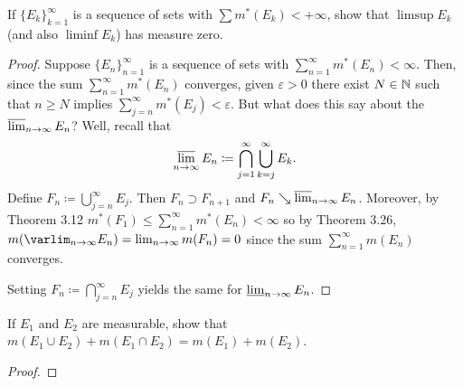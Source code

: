 \begin{problem}
  If ${\{E_k\}}_{k=1}^\infty$ is a sequence of sets with
  $\sum m^*(E_k)<+\infty$, show that $\limsup E_k$ (and also $\liminf E_k$)
  has measure zero.
\end{problem}
\begin{proof}
  Suppose ${\{E_n\}}_{n=1}^\infty$ is a sequence of sets with
  $\sum_{n=1}^\infty m^*(E_n)<\infty$. Then, since the sum
  $\sum_{n=1}^\infty m^*(E_n)$ converges, given $\varepsilon>0$ there
  exist $N\in\mathbb{N}$ such that $n\geq N$ implies
  $\sum_{j=n}^\infty m^*(E_j)<\varepsilon$. But what does this say about
  the $\varlimsup_{n\to\infty} E_n$? Well, recall that
  \[
    \varlimsup_{n\to\infty}
    E_n\coloneq\bigcap_{j=1}^\infty\bigcup_{k=j}^\infty E_k.
  \]
  Define $F_n\coloneq\bigcup_{j=n}^\infty E_j$. Then $F_n\supset F_{n+1}$
  and $F_n\searrow\varlimsup_{n\to\infty} E_n$. Moreover, by Theorem 3.12
  $m^*(F_1)\leq\sum_{n=1}^\infty m^*(E_n)<\infty$ so by Theorem 3.26,
  $m(\varlim_{n\to\infty} E_n)=\lim_{n\to\infty}m(F_n)=0$ since the sum
  $\sum_{n=1}^\infty m(E_n)$ converges.

  Setting $F_n\coloneq\bigcap_{j=n}^\infty E_j$ yields the same for
  $\varliminf_{n\to\infty} E_n$.
\end{proof}

\begin{problem}
  If $E_1$ and $E_2$ are measurable, show that
  $m(E_1\cup E_2)+m(E_1\cap E_2)=m(E_1)+m(E_2)$.
\end{problem}
\begin{proof}
\end{proof}

